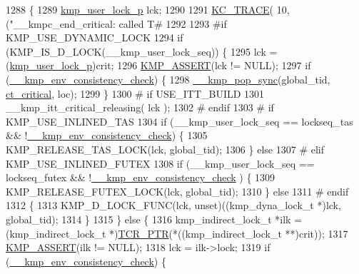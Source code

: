 \begin{DoxyCode}
1288 \{
1289     \hyperlink{unionkmp__user__lock}{kmp\_user\_lock\_p} lck;
1290 
1291     \hyperlink{kmp__debug_8h_ab49eefbf8c74cfe98a90ce7ec8864add}{KC\_TRACE}( 10, (\textcolor{stringliteral}{"\_\_kmpc\_end\_critical: called T#%
1292 
1293 \textcolor{preprocessor}{#if KMP\_USE\_DYNAMIC\_LOCK}
1294 \textcolor{preprocessor}{}    \textcolor{keywordflow}{if} (KMP\_IS\_D\_LOCK(\_\_kmp\_user\_lock\_seq)) \{
1295         lck = (\hyperlink{kmp__lock_8h_a35c88b3ea74b2a8d633ec8156c1c4670}{kmp\_user\_lock\_p})crit;
1296         \hyperlink{kmp__debug_8h_a5323a368e8ba273b17c46906dd9ec78c}{KMP\_ASSERT}(lck != NULL);
1297         \textcolor{keywordflow}{if} (\hyperlink{kmp_8h_ab4062d4f566c901230e51490a8819ba0}{\_\_kmp\_env\_consistency\_check}) \{
1298             \hyperlink{kmp__error_8c_ab716717d70650eeeb205b057232d7c1c}{\_\_kmp\_pop\_sync}(global\_tid, \hyperlink{kmp_8h_a1582e7ddc609220a660d10244ef3e315a99f163854d01ce42ec99e6353d3907c6}{ct\_critical}, loc);
1299         \}
1300 \textcolor{preprocessor}{# if USE\_ITT\_BUILD}
1301 \textcolor{preprocessor}{}        \_\_kmp\_itt\_critical\_releasing( lck );
1302 \textcolor{preprocessor}{# endif}
1303 \textcolor{preprocessor}{}\textcolor{preprocessor}{# if KMP\_USE\_INLINED\_TAS}
1304 \textcolor{preprocessor}{}        \textcolor{keywordflow}{if} (\_\_kmp\_user\_lock\_seq == lockseq\_tas && !\hyperlink{kmp_8h_ab4062d4f566c901230e51490a8819ba0}{\_\_kmp\_env\_consistency\_check}) 
      \{
1305             KMP\_RELEASE\_TAS\_LOCK(lck, global\_tid);
1306         \} \textcolor{keywordflow}{else}
1307 \textcolor{preprocessor}{# elif KMP\_USE\_INLINED\_FUTEX}
1308 \textcolor{preprocessor}{}        \textcolor{keywordflow}{if} (\_\_kmp\_user\_lock\_seq == lockseq\_futex && !\hyperlink{kmp_8h_ab4062d4f566c901230e51490a8819ba0}{\_\_kmp\_env\_consistency\_check}
      ) \{
1309             KMP\_RELEASE\_FUTEX\_LOCK(lck, global\_tid);
1310         \} \textcolor{keywordflow}{else}
1311 \textcolor{preprocessor}{# endif}
1312 \textcolor{preprocessor}{}        \{
1313             KMP\_D\_LOCK\_FUNC(lck, unset)((kmp\_dyna\_lock\_t *)lck, global\_tid);
1314         \}
1315     \} \textcolor{keywordflow}{else} \{
1316         kmp\_indirect\_lock\_t *ilk = (kmp\_indirect\_lock\_t *)\hyperlink{kmp__os_8h_a6e40f65c18c7b47fb612607b9bf8fdfc}{TCR\_PTR}(*((kmp\_indirect\_lock\_t **)crit));
1317         \hyperlink{kmp__debug_8h_a5323a368e8ba273b17c46906dd9ec78c}{KMP\_ASSERT}(ilk != NULL);
1318         lck = ilk->lock;
1319         \textcolor{keywordflow}{if} (\hyperlink{kmp_8h_ab4062d4f566c901230e51490a8819ba0}{\_\_kmp\_env\_consistency\_check}) \{
}
\end{DoxyCode}
